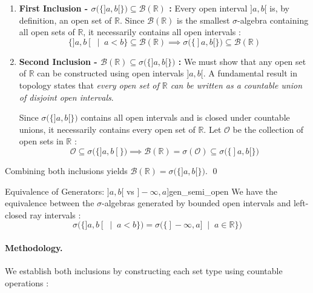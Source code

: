 \begin{enumerate}[label= \textbf{§}]
    \item \textbf{First Inclusion - $\sigma\big(\{]a, b[\}\big) \subseteq \mathcal{B}(\mathbb{R})$ :} 
    Every open interval $]a, b[$ is, by definition, an open set of $\mathbb{R}$. Since $\mathcal{B}(\mathbb{R})$ is the smallest $\sigma$-algebra containing all open sets of $\mathbb{R}$, it necessarily contains all open intervals :
    \[
        \{ ]a, b[ \;\mid\; a < b \} \subseteq \mathcal{B}(\mathbb{R}) \implies \sigma\Big( \big\{ ]a, b[ \big\} \Big) \subseteq \mathcal{B}(\mathbb{R})
    \]

    \item \textbf{Second Inclusion - $\mathcal{B}(\mathbb{R}) \subseteq \sigma\big(\{]a, b[\}\big)$ :} 
    We must show that any open set of $\mathbb{R}$ can be constructed using open intervals $]a, b[$. A fundamental result in topology states that \emph{every open set of $\mathbb{R}$ can be written as a countable union of disjoint open intervals}.
    
    Since $\sigma\big(\{]a, b[\}\big)$ contains all open intervals and is closed under countable unions, it necessarily contains every open set of $\mathbb{R}$. Let $\mathcal{O}$ be the collection of open sets in $\mathbb{R}$ :
    \[
        \mathcal{O} \subseteq \sigma\Big( \big\{ ]a, b[ \big\} \Big) \implies \mathcal{B}(\mathbb{R}) = \sigma(\mathcal{O}) \subseteq \sigma\Big( \big\{ ]a, b[ \big\} \Big)
    \]
\end{enumerate}
Combining both inclusions yields $\mathcal{B}(\mathbb{R}) = \sigma\big(\{]a, b[\}\big)$. \qed


\begin{example}{Equivalence of Generators: $]a, b[$ vs $]-\infty, a]$}{gen_semi_open}
We have the equivalence between the $\sigma$-algebras generated by bounded open intervals and left-closed ray intervals :
\[
    \sigma\Big( \big\{ ]a, b[ \;\mid\; a < b \big\} \Big) = \sigma\Big( \big\{ ]-\infty, a] \;\mid\; a \in \mathbb{R} \big\} \Big)
\]
\end{example}

\paragraph{Methodology.} We establish both inclusions by constructing each set type using countable operations :

